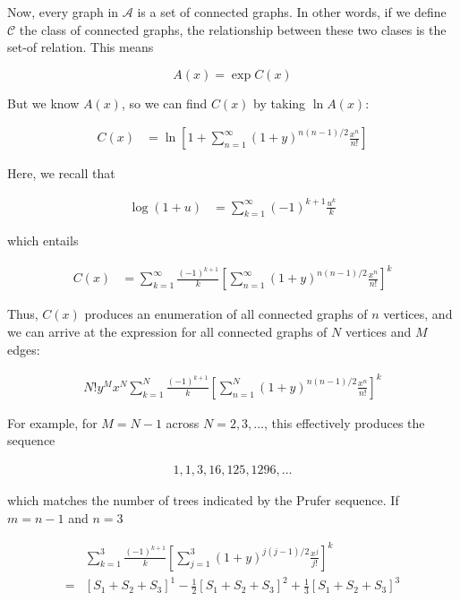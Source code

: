 \documentclass[a4paper, 12pt]{article}
\begin{document}
Now, every graph in $\mathcal{A}$ is a set of connected graphs. In other words,
if we define $\mathcal{C}$ the class of connected graphs, the relationship
between these two clases is the set-of relation. This means 

\begin{equation*}
    A(x) = \exp C(x)
\end{equation*}

But we know $A(x)$, so we can find $C(x)$ by taking $\ln A(x)$:

\begin{align*}
    C(x) &= \ln \left[1 + \sum_{n=1}^{\infty} (1+y)^{n(n-1)/2} \frac{x^n}{n!}\right]
\end{align*}

Here, we recall that 

\begin{align*}
    \log (1 + u) &= \sum_{k=1}^{\infty} (-1)^{k+1} \frac{u^k}{k}
\end{align*}

which entails 

\begin{align*}
    C(x) &= \sum_{k=1}^{\infty} \frac{ (-1)^{k+1} }{k} \left[ \sum_{n=1}^{\infty}\left( 1+y \right)^{n (n-1) / 2} \frac{x^n}{n!}  \right]^{k} 
\end{align*}

Thus, $C(x)$ produces an enumeration of all connected graphs of $n$ vertices, and we can arrive at the expression for all connected graphs of $N$ vertices and $M$ edges:

\begin{align*}
    N! y^M x^N \sum_{k=1}^{N} \frac{ (-1)^{k+1} }{k} \left[ \sum_{n=1}^{N}\left( 1+y \right)^{n (n-1) / 2} \frac{x^n}{n!}  \right]^{k} 
\end{align*}

For example, for $M = N - 1$ across $N = 2, 3, \ldots$, this effectively produces the sequence 

\begin{align*}
    1, 1, 3, 16, 125, 1296, \ldots
\end{align*}

which matches the number of trees indicated by the Prufer sequence. If $m = n - 1$ and $n = 3$

\begin{align*}
    &\sum_{k=1}^{3} \frac{(-1)^{k+1}}{k} \left[ \sum_{j=1}^{3}(1+y)^{j(j-1) / 2} \frac{x^j}{j!} \right]^{k} \\ 
    = &\left[ S_1 + S_2 + S_3 \right]^{1} - \frac{1}{2}\left[ S_1 + S_2 + S_3 \right]^2 + \frac{1}{3}\left[ S_1 + S_2 + S_3 \right]^3  \\ 
\end{align*}
\end{document}
